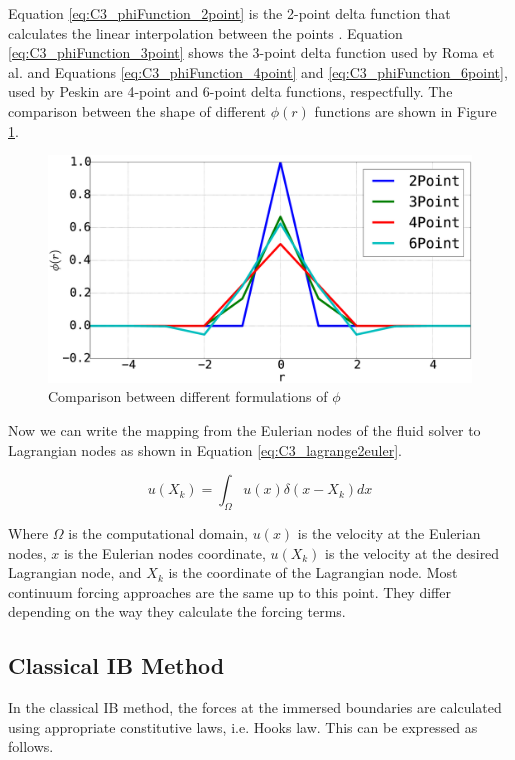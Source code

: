 Equation \eqref{eq:C3_phiFunction_2point} is the 2-point delta function that calculates the linear interpolation between the points \cite{saiki1996numerical}. Equation \eqref{eq:C3_phiFunction_3point} shows the 3-point delta function used by Roma et al. \cite{roma1999adaptive} and Equations \eqref{eq:C3_phiFunction_4point} and \eqref{eq:C3_phiFunction_6point}, used by Peskin \cite{peskin2002immersed} are 4-point and 6-point delta functions, respectfully. The comparison between the shape of different $\phi(r)$ functions are shown in Figure \ref{fig:C3_phi_function}.

\begin{figure}[H]
    \centering
    \includegraphics[width=14.cm]{Chapter_3/figure/phi_function.eps}
    \caption{Comparison between different formulations of $\phi$}
    \label{fig:C3_phi_function}
\end{figure}

Now we can write the mapping from the Eulerian nodes of the fluid solver to Lagrangian nodes as shown in Equation \eqref{eq:C3_lagrange2euler}.

\begin{equation}\label{eq:C3_lagrange2euler}
    u(X_k) = \int_\Omega u(x) \delta(x - X_k) dx
\end{equation}

Where $\Omega$ is the computational domain, $u(x)$ is the velocity at the Eulerian nodes, $x$ is the Eulerian nodes coordinate, $u(X_k)$ is the velocity at the desired Lagrangian node, and $X_k$ is the coordinate of the Lagrangian node. Most continuum forcing approaches are the same up to this point. They differ depending on the way they calculate the forcing terms.

\subsection{Classical IB Method}
In the classical IB method, the forces at the immersed boundaries are calculated using appropriate constitutive laws, i.e. Hooks law. This can be expressed as follows.

